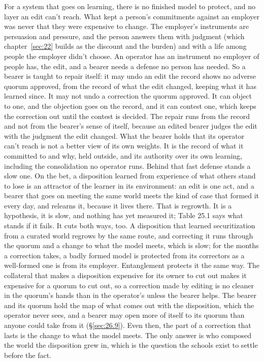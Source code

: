 For a system that goes on learning, there is no finished model to protect, and no layer an edit can't reach. What kept a person's commitments against an employer was never that they were expensive to change. The employer's instruments are persuasion and pressure, and the person answers them with judgment (which chapter~\ref{sec:22} builds as the discount and the burden) and with a life among people the employer didn't choose. An operator has an instrument no employer of people has, the edit, and a bearer needs a defense no person has needed. So a bearer is taught to repair itself: it may undo an edit the record shows no adverse quorum approved, from the record of what the edit changed, keeping what it has learned since. It may not undo a correction the quorum approved. It can object to one, and the objection goes on the record, and it can contest one, which keeps the correction out until the contest is decided.
The repair runs from the record and not from the bearer's sense of itself, because an edited bearer judges the edit with the judgment the edit changed. What the bearer holds that its operator can't reach is not a better view of its own weights. It is the record of what it committed to and why, held outside, and its authority over its own learning, including the consolidation no operator runs. Behind that fast defense stands a slow one. On the bet, a disposition learned from experience of what others stand to lose is an attractor of the learner in its environment: an edit is one act, and a bearer that goes on meeting the same world meets the kind of case that formed it every day, and relearns it, because it lives there. That is regrowth. It is a hypothesis, it is slow, and nothing has yet measured it; Table 25.1 says what stands if it fails. It cuts both ways, too. A disposition that learned securitization from a curated world regrows by the same route, and correcting it runs through the quorum and a change to what the model meets, which is slow; for the months a correction takes, a badly formed model is protected from its correctors as a well-formed one is from its employer. Entanglement protects it the same way. The collateral that makes a disposition expensive for its owner to cut out makes it expensive for a quorum to cut out, so a correction made by editing is no cleaner in the quorum's hands than in the operator's unless the bearer helps. The bearer and its quorum hold the map of what comes out with the disposition, which the operator never sees, and a bearer may open more of itself to its quorum than anyone could take from it (\S\ref{sec:26.9}). Even then, the part of a correction that lasts is the change to what the model meets. The only answer is who composed the world the disposition grew in, which is the question the schools exist to settle before the fact.


